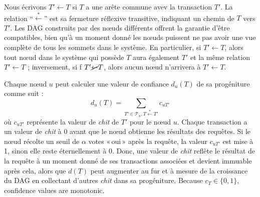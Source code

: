 Nous écrivons $T' \gets T$ si $T$ a une arête commune avev la transaction $T'$.
La relation ``$\stackrel{*}{\gets}$'' est sa fermeture réflexive transitive, indiquant un chemin de $T$ vers $T'$.
Les DAG construits par des nœuds différents offrent la garantie d'être compatibles, bien qu'à un moment donné les nœuds puissent ne pas avoir une vue complète de tous les sommets dans le système.
En particulier, si $T' \gets T$, alors tout nœud dans le système qui possède $T$ aura également $T'$ et la même relation $T' \gets T$ ; inversement, si f $T' \cancel{\gets} T$, alors aucun nœud n'arrivera à $T' \gets T$.

Chaque nœud $u$ peut calculer une valeur de confiance $d_u(T)$ de sa progéniture comme suit :
\[ d_u(T) = \sum_{T' \in \mathcal{T}_u, T \stackrel{*}{\gets} T'}c_{uT'}\]
où $c_{uT'}$ représente la valeur de \emph{chit} de $T'$ pour le nœud $u$. Chaque transaction a un valeur de \emph{chit} à $0$ avant que le nœud obtienne les résultats des requêtes. Si le nœud récolte un seuil de $\alpha$ votes «\,oui\,» après la requête, la valeur $c_{uT'}$ est mise à 1, sinon elle reste éternellement à $0$.
Donc, une valeur de \emph{chit} reflète le résultat de la requête à un moment donné de ses transactions associées et devient immuable après cela, alors que $d(T)$ peut augmenter au fur et à mesure de la croissance du DAG en collectant d'autres \emph{chit} dans sa progéniture.
Because $c_T \in \{0, 1\}$, confidence values are monotonic.

